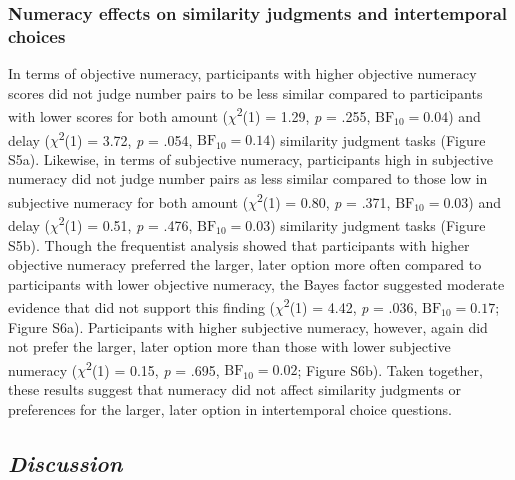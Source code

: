 \documentclass[
  pub,floatsintext]{apa6}
\begin{document}
\hypertarget{numeracy-effects-on-similarity-judgments-and-intertemporal-choices-1}{%
\subsubsection{Numeracy effects on similarity judgments and intertemporal choices}\label{numeracy-effects-on-similarity-judgments-and-intertemporal-choices-1}}

In terms of objective numeracy, participants with higher objective numeracy scores did not judge number pairs to be less similar compared to participants with lower scores for both amount (\(\chi\)\textsuperscript{2}(1) = 1.29, \emph{p} = .255, \(\mathrm{BF}_{\textrm{10}} = 0.04\)) and delay (\(\chi\)\textsuperscript{2}(1) = 3.72, \emph{p} = .054, \(\mathrm{BF}_{\textrm{10}} = 0.14\)) similarity judgment tasks (Figure S5a). Likewise, in terms of subjective numeracy, participants high in subjective numeracy did not judge number pairs as less similar compared to those low in subjective numeracy for both amount (\(\chi\)\textsuperscript{2}(1) = 0.80, \emph{p} = .371, \(\mathrm{BF}_{\textrm{10}} = 0.03\)) and delay (\(\chi\)\textsuperscript{2}(1) = 0.51, \emph{p} = .476, \(\mathrm{BF}_{\textrm{10}} = 0.03\)) similarity judgment tasks (Figure S5b). Though the frequentist analysis showed that participants with higher objective numeracy preferred the larger, later option more often compared to participants with lower objective numeracy, the Bayes factor suggested moderate evidence that did not support this finding (\(\chi\)\textsuperscript{2}(1) = 4.42, \emph{p} = .036, \(\mathrm{BF}_{\textrm{10}} = 0.17\); Figure S6a). Participants with higher subjective numeracy, however, again did not prefer the larger, later option more than those with lower subjective numeracy (\(\chi\)\textsuperscript{2}(1) = 0.15, \emph{p} = .695, \(\mathrm{BF}_{\textrm{10}} = 0.02\); Figure S6b). Taken together, these results suggest that numeracy did not affect similarity judgments or preferences for the larger, later option in intertemporal choice questions.

\hypertarget{discussion-1}{%
\subsection{\texorpdfstring{\emph{Discussion}}{Discussion}}\label{discussion-1}}
\end{document}
